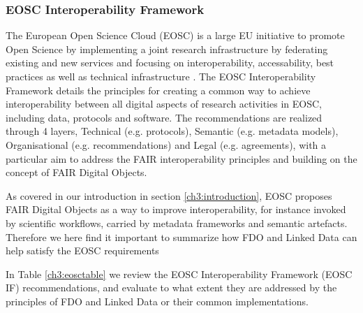 \subsubsection{EOSC Interoperability Framework}\label{ch3:eosc-interoperability-framework}

The European Open Science Cloud (EOSC) is a large EU initiative to promote Open Science by implementing a joint research infrastructure by federating existing and new services and focusing on interoperability, accessability, best practices as well as technical infrastructure \cite{10.2777/940154}. The EOSC Interoperability Framework \cite{eosc-interop-framework} details the principles for creating a common way to achieve interoperability between all digital aspects of research activities in EOSC, including data, protocols and software. The recommendations are realized through 4 layers, Technical (e.g. protocols), Semantic (e.g. metadata models), Organisational (e.g. recommendations) and Legal (e.g. agreements), with a particular aim to address the FAIR interoperability principles and building on the concept of FAIR Digital Objects. 

As covered in our introduction in section \vref{ch3:introduction}, EOSC proposes FAIR Digital Objects as a way to improve interoperability, for instance invoked by scientific workflows, carried by metadata frameworks and semantic artefacts. Therefore we here find it important to summarize how FDO and Linked Data can help satisfy the EOSC requirements

In Table \vref{ch3:eosctable} we review the EOSC Interoperability Framework (EOSC IF) recommendations, and evaluate to what extent they are addressed by the principles of FDO and Linked Data or their common implementations.

